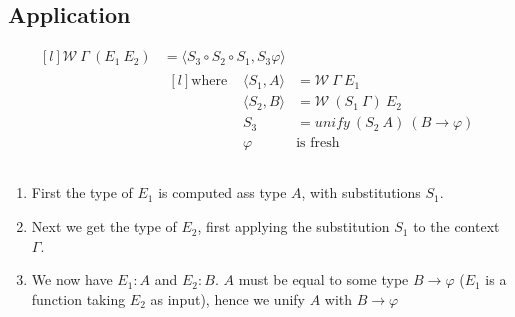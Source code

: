 \subsection{Application}

\[\begin{matrix*}[l]
    \mathcal{W} \ \Gamma \ (E_1 \ E_2) & = \langle S_3 \circ S_2 \circ S_1, S_3 \varphi \rangle \\
    & \begin{matrix*}[l]
        \text{where } & \langle S_1, A \rangle & = \mathcal{W} \ \Gamma \ E_1 \\
        & \langle S_2, B \rangle & = \mathcal{W} \ (S_1 \ \Gamma) \ E_2 \\
        & S_3 & = unify \ (S_2 \ A) \ (B \to \varphi) \\
        & \varphi & \text{is fresh} \\
    \end{matrix*} \\
\end{matrix*}\]
\begin{enumerate}
    \item First the type of $E_1$ is computed ass type $A$, with substitutions $S_1$.
    \item Next we get the type of $E_2$, first applying the substitution $S_1$ to the context $\Gamma$.
    \item We now have $E_1 : A$ and $E_2 : B$. $A$ must be equal to some type $B \to \varphi$ ($E_1$ is a function taking $E_2$ as input), hence we unify $A$ with $B \to \varphi$
\end{enumerate}

